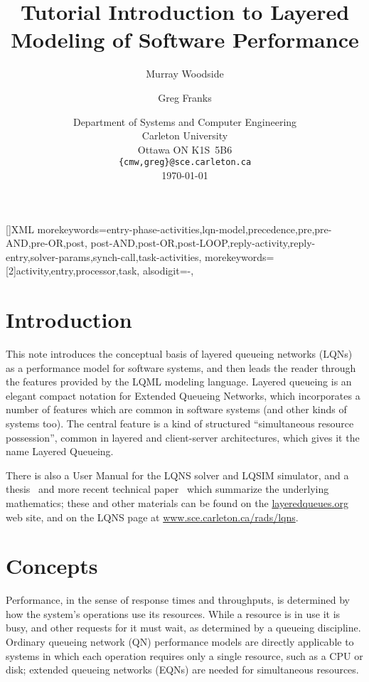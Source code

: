 \documentclass[11pt]{article}
\begin{document}
[]{XML}{
  morekeywords={entry-phase-activities,lqn-model,precedence,pre,pre-AND,pre-OR,post,
  post-AND,post-OR,post-LOOP,reply-activity,reply-entry,solver-params,synch-call,task-activities},
  morekeywords={[2]activity,entry,processor,task},
  alsodigit={-},
}
\title{Tutorial Introduction to Layered Modeling of Software Performance}

\author{Murray Woodside \and Greg Franks}
\date{Department of Systems and Computer Engineering\\
  Carleton University\\
  Ottawa ON K1S~5B6\\
  \texttt{\{cmw,greg\}@sce.carleton.ca}\\[1cm]
  \today}
\maketitle
\clearpage
\tableofcontents
\clearpage

\section{Introduction}

This note introduces the conceptual basis of layered queueing networks (LQNs) as a
performance model for software systems, and then leads the reader through the features provided by
the LQML modeling language. Layered queueing is an elegant compact notation for Extended
Queueing Networks, which incorporates a number of features which are common in software
systems (and other kinds of systems too). The central feature is a kind of structured ``simultaneous
resource possession'', common in layered and client-server architectures, which gives it the name
Layered Queueing.

There is also a User Manual for the LQNS solver and LQSIM simulator, and a thesis~\cite{THESIS:franks-99} and
more recent technical paper~\cite{IEEESE:franks-2009-ieeese-lqn} which summarize the underlying mathematics; these and other
materials can be found on the \href{http://layeredqueues.org}{layeredqueues.org} web site, and on the LQNS page at
\url{www.sce.carleton.ca/rads/lqns}.

\section{Concepts}
\label{sec:concept}

Performance, in the sense of response times and throughputs, is determined by how the
system's operations use its resources. While a resource is in use it is busy, and other requests for it
must wait, as determined by a queueing discipline. Ordinary queueing network (QN) performance
models are directly applicable to systems in which each operation requires only a single resource,
such as a CPU or disk; extended queueing networks (EQNs) are needed for simultaneous resources.
\end{document}
